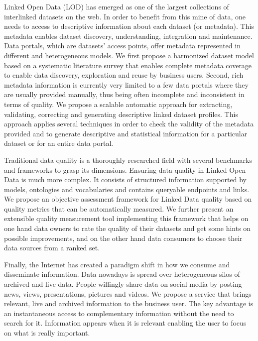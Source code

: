 Linked Open Data (LOD) has emerged as one of the largest collections of interlinked datasets on the web. In order to benefit from this mine of data, one needs to access to descriptive information about each dataset (or metadata). This metadata enables dataset discovery, understanding, integration and maintenance. Data portals, which are datasets' access points, offer metadata represented in different and heterogeneous models. We first propose a harmonized dataset model based on a systematic literature survey that enables complete metadata coverage to enable data discovery, exploration and reuse by business users. Second, rich metadata information is currently very limited to a few data portals where they are usually provided manually, thus being often incomplete and inconsistent in terms of quality. We propose a scalable automatic approach for extracting, validating, correcting and generating descriptive linked dataset profiles. This approach applies several techniques in order to check the validity of the metadata provided and to generate descriptive and statistical information for a particular dataset or for an entire data portal.

Traditional data quality is a thoroughly researched field with several benchmarks and frameworks to grasp its dimensions. Ensuring data quality in Linked Open Data is much more complex. It consists of structured information supported by models, ontologies and vocabularies and contains queryable endpoints and links. We propose an objective assessment framework for Linked Data quality based on quality metrics that can be automatically measured. We further present an extensible quality measurement tool implementing this framework that helps on one hand data owners to rate the quality of their datasets and get some hints on possible improvements, and on the other hand data consumers to choose their data sources from a ranked set.

Finally, the Internet has created a paradigm shift in how we consume and disseminate information. Data nowadays is spread over heterogeneous silos of archived and live data. People willingly share data on social media by posting news, views, presentations, pictures and videos. We propose a service that brings relevant, live and archived information to the business user. The key advantage is an instantaneous access to complementary information without the need to search for it. Information appears when it is relevant enabling the user to focus on what is really important.
